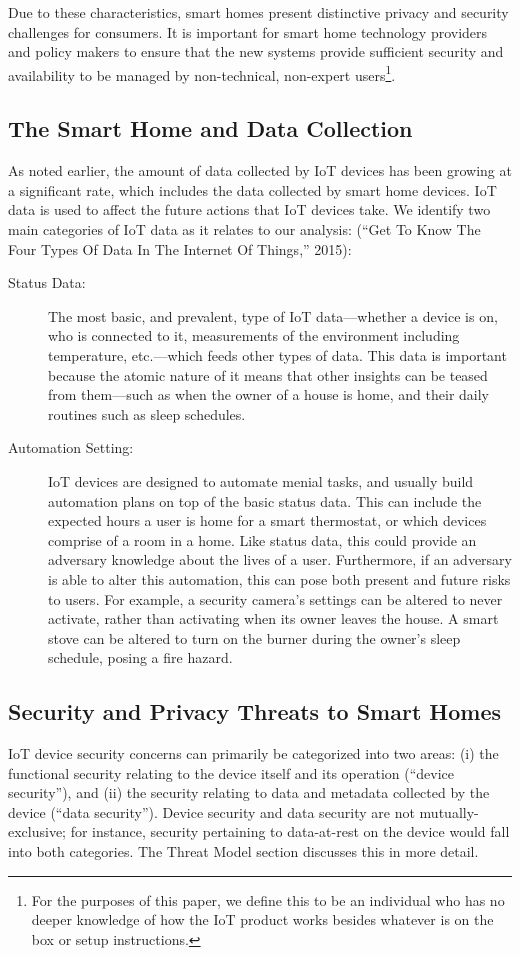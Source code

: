 Due to these characteristics, smart homes present distinctive privacy and security challenges for consumers. It is important for smart home technology providers and policy makers to ensure that the new systems provide sufficient security and availability to be managed by non-technical, non-expert users\footnote{For the purposes of this paper, we define this to be an individual who has no deeper knowledge of how the IoT product works besides whatever is on the box or setup instructions.}.

\subsection{The Smart Home and Data Collection}
As noted earlier, the amount of data collected by IoT devices has been growing at a significant rate, which includes the data collected by smart home devices. IoT data is used to affect the future actions that IoT devices take. We identify two main categories of IoT data as it relates to our analysis: (“Get To Know The Four Types Of Data In The Internet Of Things,” 2015):

\begin{description}
\item [Status Data:] The most basic, and prevalent, type of IoT data---whether a device is on, who is connected to it, measurements of the environment including temperature, etc.---which feeds other types of data. This data is important because the atomic nature of it means that other insights can be teased from them---such as when the owner of a house is home, and their daily routines such as sleep schedules.
\item [Automation Setting:] IoT devices are designed to automate menial tasks, and usually build automation plans on top of the basic status data. This can include the expected hours a user is home for a smart thermostat, or which devices comprise of a room in a home. Like status data, this could provide an adversary knowledge about the lives of a user. Furthermore, if an adversary is able to alter this automation, this can pose both present and future risks to users. For example, a security camera’s settings can be altered to never activate, rather than activating when its owner leaves the house. A smart stove can be altered to turn on the burner during the owner’s sleep schedule, posing a fire hazard.
\end{description}

\subsection{Security and Privacy Threats to Smart Homes}
IoT device security concerns can primarily be categorized into two areas: (i) the functional security relating to the device itself and its operation (“device security”), and (ii) the security relating to data and metadata collected by the device (“data security”). Device security and data security are not mutually-exclusive; for instance, security pertaining to data-at-rest on the device would fall into both categories. The Threat Model section discusses this in more detail.

